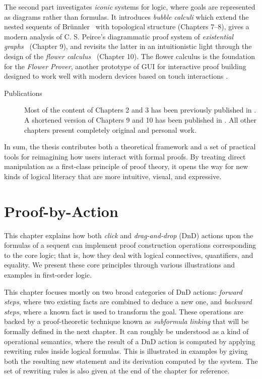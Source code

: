 \documentclass[11pt]{article}
\begin{document}
The second part investigates \emph{iconic} systems for logic, where goals are represented as diagrams rather than formulas. It introduces \emph{bubble calculi} which extend the nested sequents of Brünnler~\cite{brunnler_deep_2009} with topological structure (Chapters 7--8), gives a modern analysis of C. S. Peirce's diagrammatic proof system of \emph{existential graphs}~\cite{Roberts+1973} (Chapter 9), and revisits the latter in an intuitionistic light through the design of the \emph{flower calculus}~\cite{flower-calculus} (Chapter 10). The flower calculus is the foundation for the \emph{Flower Prover}, another prototype of GUI for interactive proof building designed to work well with modern devices based on touch interactions \cite{flower-prover}.

\begin{description}
    \item[Publications] Most of the content of Chapters 2 and 3 has been previously published in
    \cite{dragndrop}. A shortened version of Chapters 9 and 10 has been published
    in \cite{flower-calculus}. All other chapters present completely original and personal work.
\end{description}

In sum, the thesis contributes both a theoretical framework and a set of practical tools for reimagining how users interact with formal proofs. By treating direct manipulation as a first-class principle of proof theory, it opens the way for new kinds of logical literacy that are more intuitive, visual, and expressive.

\section{Proof-by-Action}

This chapter explains how both \emph{click} and \emph{drag-and-drop} (DnD) actions upon the formulas of
a sequent can implement proof construction operations corresponding to the core logic; that is, how
they deal with logical connectives, quantifiers, and equality. We present these core principles
through various illustrations and examples in first-order logic.

This chapter focuses mostly on two broad categories of DnD actions: \emph{forward steps}, where two
existing facts are combined to deduce a new one, and \emph{backward steps}, where a known fact is
used to transform the goal. These operations are backed by a proof-theoretic technique known as
\emph{subformula linking} that will be formally defined in the next chapter. It can roughly be
understood as a kind of operational semantics, where the result of a DnD action is computed by
applying rewriting rules inside logical formulas. This is illustrated in examples by giving both the
resulting new statement and its derivation computed by the system. The set of rewriting rules is
also given at the end of the chapter for reference.
\end{document}
